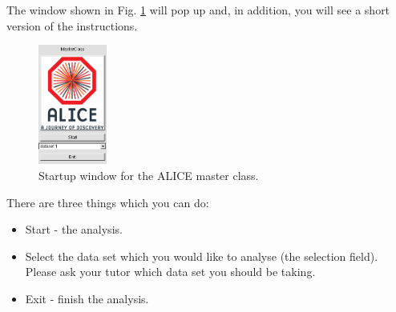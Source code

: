 \documentclass{article}
\begin{document}
The window shown in Fig. \ref{fig:Startup} will pop up and, in addition, you 
will see a short version of the instructions.

\begin{figure}[b]
 	\centering
 	\includegraphics[width=0.2\textwidth]{StarterMasterClasses.png}
	\caption{Startup window for the ALICE master class.}
	\label{fig:Startup}
\end{figure}

There are three things which you can do:
\begin{itemize}
\item Start - the analysis.
\item Select the data set which you would like to analyse (the selection 
      field). Please ask your tutor which data set you should be taking.
\item Exit - finish the analysis.
\end{itemize}
\end{document}
